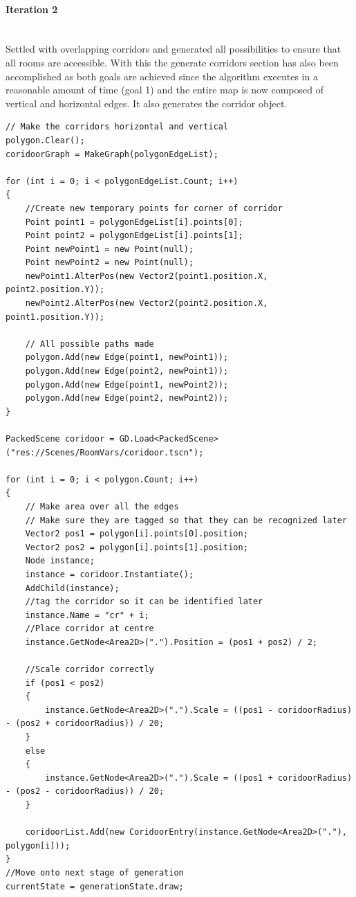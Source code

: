 \documentclass{article}
\newcommand{\myparagraph}[1]{\paragraph{#1}\mbox{}\\} %
\begin{document}
\myparagraph{Iteration 2}
Settled with overlapping corridors and generated all possibilities to ensure that all rooms are accessible. With this the generate corridors section has also been accomplished as both goals are achieved since the algorithm executes in a reasonable amount of time (goal 1) and the entire map is now composed of vertical and horizontal edges. It also generates the corridor object.
\begin{lstlisting}
// Make the corridors horizontal and vertical
polygon.Clear();
coridoorGraph = MakeGraph(polygonEdgeList);

for (int i = 0; i < polygonEdgeList.Count; i++)
{
    //Create new temporary points for corner of corridor
    Point point1 = polygonEdgeList[i].points[0];
    Point point2 = polygonEdgeList[i].points[1];
    Point newPoint1 = new Point(null);
    Point newPoint2 = new Point(null);
    newPoint1.AlterPos(new Vector2(point1.position.X, point2.position.Y));
    newPoint2.AlterPos(new Vector2(point2.position.X, point1.position.Y));

    // All possible paths made
    polygon.Add(new Edge(point1, newPoint1));
    polygon.Add(new Edge(point2, newPoint1));
    polygon.Add(new Edge(point1, newPoint2));
    polygon.Add(new Edge(point2, newPoint2));
}

PackedScene coridoor = GD.Load<PackedScene>("res://Scenes/RoomVars/coridoor.tscn");

for (int i = 0; i < polygon.Count; i++)
{
    // Make area over all the edges
    // Make sure they are tagged so that they can be recognized later
    Vector2 pos1 = polygon[i].points[0].position;
    Vector2 pos2 = polygon[i].points[1].position;
    Node instance;
    instance = coridoor.Instantiate();
    AddChild(instance);
    //tag the corridor so it can be identified later
    instance.Name = "cr" + i;
    //Place corridor at centre 
    instance.GetNode<Area2D>(".").Position = (pos1 + pos2) / 2;

	//Scale corridor correctly
    if (pos1 < pos2)
    {
        instance.GetNode<Area2D>(".").Scale = ((pos1 - coridoorRadius) - (pos2 + coridoorRadius)) / 20;
    }
    else
    {
        instance.GetNode<Area2D>(".").Scale = ((pos1 + coridoorRadius) - (pos2 - coridoorRadius)) / 20;
    }

    coridoorList.Add(new CoridoorEntry(instance.GetNode<Area2D>("."), polygon[i]));
}
//Move onto next stage of generation
currentState = generationState.draw;
\end{lstlisting}
\end{document}
